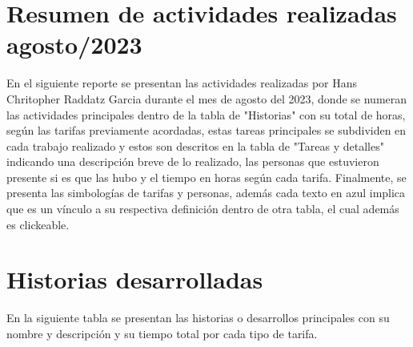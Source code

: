 \documentclass{article}
\begin{document}
\section*{Resumen de actividades realizadas agosto/2023}

En el siguiente reporte se presentan las actividades realizadas por Hans Chritopher Raddatz Garcia durante el mes de agosto del 2023, donde se numeran las actividades principales dentro de la tabla de "Historias" con su total de horas, según las tarifas previamente acordadas, estas tareas principales se subdividen en cada trabajo realizado y estos son descritos en la tabla de "Tareas y detalles" indicando una descripción breve de lo realizado, las personas que estuvieron presente si es que las hubo y el tiempo en horas según cada tarifa.
Finalmente, se presenta las simbologías de tarifas y personas, además cada texto en azul implica que es un vínculo a su respectiva definición dentro de otra tabla, el cual además es clickeable. 

\section{Historias desarrolladas}
En la siguiente tabla se presentan las historias o desarrollos principales con su nombre y descripción y su tiempo total por cada tipo de tarifa.
\end{document}
